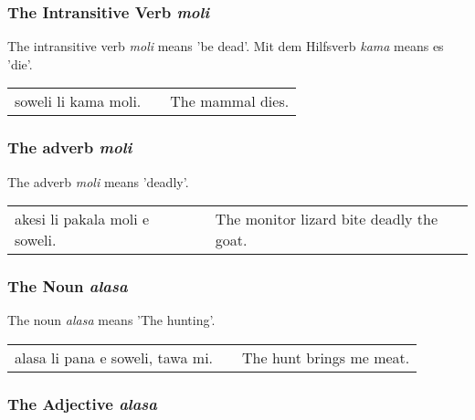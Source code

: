 %
%
\subsubsection*{The Intransitive Verb \textit{moli}}
%
%

The intransitive verb \textit{moli} means 'be dead'.
Mit dem Hilfsverb \textit{kama} means es 'die'. 

\begin{supertabular}{p{5,5cm}|ll}
soweli li kama moli. && The mammal dies. \\
\end{supertabular} 

%
%
\subsubsection*{The adverb \textit{moli}}
%
%
The adverb \textit{moli} means 'deadly'. 

\begin{supertabular}{p{5,5cm}|ll}
akesi li pakala moli e soweli. && The monitor lizard bite deadly the goat. \\
\end{supertabular} 

%
%
\subsubsection*{The Noun \textit{alasa}}
%

The noun \textit{alasa} means 'The hunting'.

\begin{supertabular}{p{5,5cm}|ll}
alasa li pana e soweli, tawa mi. && The hunt brings me meat.\\
\end{supertabular}

%
\subsubsection*{The Adjective \textit{alasa}}
%

